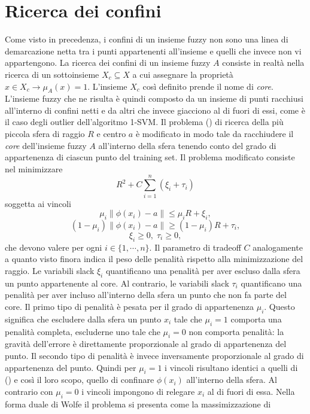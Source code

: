 \documentclass [11pt,a4paper,twoside,openright] {book}
\begin{document}
\section{Ricerca dei confini}
Come visto in precedenza, i confini di un insieme fuzzy non sono una linea di demarcazione netta tra i punti appartenenti all'insieme e quelli che invece non vi appartengono. La ricerca dei confini di un insieme fuzzy $A$ consiste in realtà nella ricerca di un sottoinsieme $X_c \subseteq X$ a cui assegnare la proprietà $x \in X_c \rightarrow \mu_A(x) = 1$. L'insieme $X_c$ così definito prende il nome di \textit{core}. L'insieme fuzzy che ne risulta è quindi composto da un insieme di punti racchiusi all'interno di confini netti e da altri che invece giacciono al di fuori di essi, come è il caso degli outlier dell'algoritmo 1-SVM. Il problema () di ricerca della più piccola sfera di raggio $R$ e centro $a$ è modificato in modo tale da racchiudere il \textit{core} dell'insieme fuzzy $A$ all'interno della sfera tenendo conto del grado di appartenenza di ciascun punto del training set. Il problema modificato consiste nel minimizzare
\begin{equation}
R^2 + C\sum_{i=1}^n (\xi_i + \tau_i)
\end{equation}
soggetta ai vincoli
\begin{equation}\label{out}
\mu_i \parallel \phi(x_i) - a \parallel \leq \mu_i R + \xi_i,
\end{equation}
\begin{equation}\label{in}
(1-\mu_i) \parallel \phi(x_i) - a \parallel \geq (1- \mu_i) R + \tau_i,
\end{equation}
\begin{equation}
\xi_i \geq 0,\; \tau_i \geq 0,
\end{equation}
che devono valere per ogni $i \in \lbrace 1, \cdots, n \rbrace$. Il parametro di tradeoff $C$ analogamente a quanto visto finora indica il peso delle penalità rispetto alla minimizzazione del raggio. Le variabili slack $\xi_i$ quantificano una penalità per aver escluso dalla sfera un punto appartenente al core. Al contrario, le variabili slack $\tau_i$ quantificano una penalità per aver incluso all'interno della sfera un punto che non fa parte del core. Il primo tipo di penalità è pesata per il grado di appartenenza $\mu_i$. Questo significa che escludere dalla sfera un punto $x_i$ tale che $\mu_i = 1$ comporta una penalità completa, escluderne uno tale che $\mu_i = 0$ non comporta penalità: la gravità dell'errore è direttamente proporzionale al grado di appartenenza del punto. Il secondo tipo di penalità è invece inversamente proporzionale al grado di appartenenza del punto.  Quindi per $\mu_i = 1$ i vincoli risultano identici a quelli di () e così il loro scopo, quello di confinare $\phi(x_i)$ all'interno della sfera. Al contrario con $\mu_i = 0$ i vincoli impongono di relegare $x_i$ al di fuori di essa. Nella forma duale di Wolfe il problema si presenta come la massimizzazione di
\end{document}
